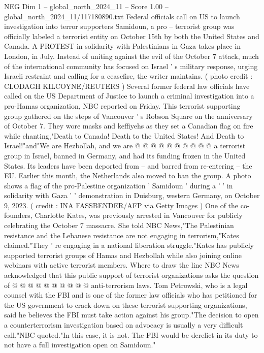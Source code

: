 \begin{textsample}{NEG Dim 1 – global\_north\_2024\_11 – Score 1.00 – global\_north\_2024\_11/117180890.txt}  \label{ex:f1_neg_114}
Federal officials call on US to launch investigation into terror supporters Samidoun, a pro -- terrorist group was officially labeled a terrorist entity on October 15th by both the United States and Canada.
A PROTEST in solidarity with Palestinians in Gaza takes place in London, in July.
Instead of uniting against the evil of the October 7 attack, much of the international community has focused on Israel ' s military response, urging Israeli restraint and calling for a ceasefire, the writer maintains. ( photo credit : CLODAGH KILCOYNE/REUTERS ) Several former federal law officials have called on the US Department of Justice to launch a criminal investigation into a pro-Hamas organization, NBC reported on Friday.
This terrorist supporting group gathered on the steps of Vancouver ' s Robson Square on the anniversary of October 7.
They wore masks and keffiyehs as they set a Canadian flag on fire while chanting,"Death to Canada!
Death to the United States!
And Death to Israel!"and"We are Hezbollah, and we are @ @ @ @ @ @ @ @ @ @ a terrorist group in Israel, banned in Germany, and had its funding frozen in the United States.
Its leaders have been deported from -- and barred from re-entering -- the EU.
Earlier this month, the Netherlands also moved to ban the group.
A photo shows a flag of the pro-Palestine organization ' Samidoun ' during a ' ' in solidarity with Gaza ' ' demonstration in Duisburg, western Germany, on October 9, 2023. ( credit : INA FASSBENDER/AFP via Getty Images ) One of the co-founders, Charlotte Kates, was previously arrested in Vancouver for publicly celebrating the October 7 massacre.
She told NBC News,"The Palestinian resistance and the Lebanese resistance are not engaging in terrorism,"Kates claimed."They ' re engaging in a national liberation struggle."Kates has publicly supported terrorist groups of Hamas and Hezbollah while also joining online webinars with active terrorist members.
Where to draw the line NBC News acknowledged that this public support of terrorist organizations asks the question of @ @ @ @ @ @ @ @ @ @ anti-terrorism laws.
Tom Petrowski, who is a legal counsel with the FBI and is one of the former law officials who has petitioned for the US government to crack down on these terrorist supporting organizations, said he believes the FBI must take action against his group."The decision to open a counterterrorism investigation based on advocacy is usually a very difficult call,"NBC quoted."In this case, it is not.
The FBI would be derelict in its duty to not have a full investigation open on Samidoun."

\end{textsample}

